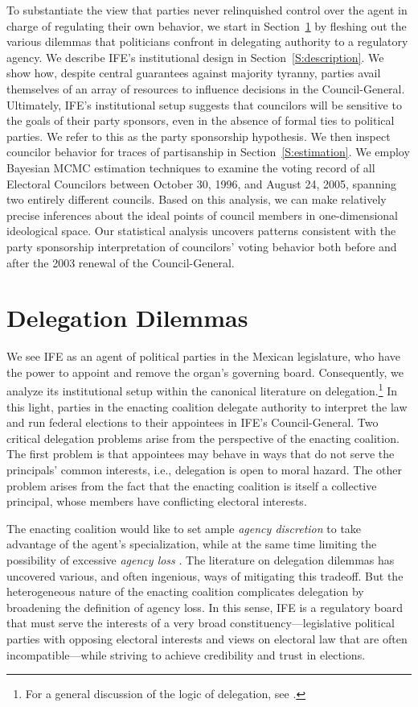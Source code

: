 \documentclass[12 pt, letter]{article}
\begin{document}
To substantiate the view that parties never relinquished control over the agent in charge of regulating their own behavior, we start in Section~\ref{S:delegation} by fleshing out the various dilemmas that politicians confront in delegating authority to a regulatory agency. We describe IFE's institutional design in Section~\ref{S:description}.  We show how, despite central guarantees against majority tyranny, parties avail themselves of an array of resources to influence decisions in the Council-General. Ultimately, IFE's institutional setup suggests that councilors will be sensitive to the goals of their party sponsors, even in the absence of formal ties to political parties.  We refer to this as the party sponsorship hypothesis.  We then inspect councilor behavior for traces of partisanship in Section~\ref{S:estimation}. We employ Bayesian MCMC estimation techniques to examine the voting record of all Electoral Councilors between October 30, 1996, and August 24, 2005, spanning two entirely different councils.  Based on this analysis, we can make relatively precise inferences about the ideal points of council members in one-dimensional ideological space.  Our statistical analysis uncovers patterns consistent with the party sponsorship interpretation of councilors' voting behavior both before and after the 2003 renewal of the Council-General.

\section{Delegation Dilemmas}\label{S:delegation}
We see IFE as an agent of political parties in the Mexican legislature, who have the power to appoint and remove the organ's governing board. Consequently, we analyze its institutional setup within the canonical literature on delegation.\footnote{For a general discussion of the logic of delegation, see \citet[22-38]{Kiewiet1991}.}  In this light, parties in the enacting coalition delegate authority to interpret the law and run federal elections to their appointees in IFE's Council-General.  Two critical delegation problems arise from the perspective of the enacting coalition.   The first problem is that appointees may behave in ways that do not serve the principals' common interests, i.e., delegation is open to moral hazard. The other problem arises from the fact that the enacting coalition is itself a collective principal, whose members have conflicting electoral interests.

The enacting coalition would like to set ample \emph{agency discretion} to take advantage of the agent's specialization, while at the same time limiting the possibility of excessive \emph{agency loss} \citep{Madison1788, Epstein1999, Huber2002, Miller2005}.  The literature on delegation dilemmas has uncovered various, and often ingenious, ways of mitigating this tradeoff.  But the heterogeneous nature of the enacting coalition complicates delegation by broadening the definition of agency loss.  In this sense, IFE is a regulatory board that must serve the interests of a very broad constituency---legislative political parties with opposing electoral interests and views on electoral law that are often incompatible---while striving to  achieve credibility and trust in elections.
\end{document}
